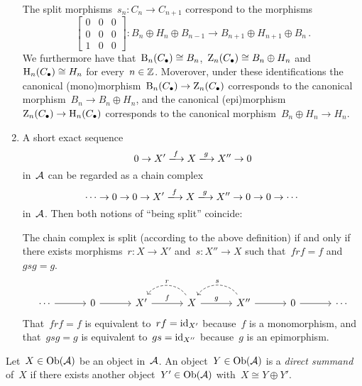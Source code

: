 \begin{remark*}
\begin{enumerate}
      The split morphisms~$s_n \colon C_n \to C_{n+1}$ correspond to the morphisms
      \[
        \begin{bmatrix}
          0 & 0 & 0 \\
          0 & 0 & 0 \\
          1 & 0 & 0
        \end{bmatrix}
        \colon
        B_n \oplus H_n \oplus B_{n-1}
        \to
        B_{n+1} \oplus H_{n+1} \oplus B_n \,.
      \]
      We furthermore have that~$\operatorname{B}_n(C_\bullet) \cong B_n$,~$\operatorname{Z}_n(C_\bullet) \cong B_n \oplus H_n$ and~$\operatorname{H}_n(C_\bullet) \cong H_n$ for every~$n \in \mathbb{Z}$.
      Moverover, under these identifications the canonical (mono)mor\-phism~$\operatorname{B}_n(C_\bullet) \to \operatorname{Z}_n(C_\bullet)$ corresponds to the canonical morphism~$B_n \to B_n \oplus H_n$, and the canonical (epi)morphism~$\operatorname{Z}_n(C_\bullet) \to \operatorname{H}_n(C_\bullet)$ corresponds to the canonical morphism~$B_n \oplus H_n \to H_n$.
    \item
      A short exact sequence
      \[
        0
        \to
        X'
        \xlongto{f}
        X
        \xlongto{g}
        X''
        \to
        0
      \]
      in~$\mathcal{A}$ can be regarded as a chain complex
      \[
        \dotsb
        \to
        0
        \to
        0
        \to
        X'
        \xlongto{f}
        X
        \xlongto{g}
        X''
        \to
        0
        \to
        0
        \to
        \dotsb
      \]
      in~$\mathcal{A}$.
      Then both notions of \enquote{being split} coincide:
      
      The chain complex is split (according to the above definition) if and only if there exists morphisms~$r \colon X \to X'$ and~$s \colon X'' \to X$ such that~$frf = f$ and~$gsg = g$.
      \[
        \begin{tikzcd}[column sep = 3.2em]
            \dotsb
            \arrow{r}
          & 0
            \arrow{r}
          & X'
            \arrow{r}[above]{f}
          & X
            \arrow[dashed, bend right=55]{l}[above]{r}
            \arrow{r}[above]{g}
          & X''
            \arrow[dashed, bend right=55]{l}[above]{s}
            \arrow{r}
          & 0
            \arrow{r}
          & \dotsb
        \end{tikzcd}
      \]
      That~$frf = f$ is equivalent to~$rf = \operatorname{id}_{X'}$ because~$f$ is a monomorphism, and that~$gsg = g$ is equivalent to~$gs = \operatorname{id}_{X''}$ because~$g$ is an epimorphism.
  \end{enumerate}
\end{remark*}


\begin{definition*}
  Let~$X \in \operatorname{Ob}(\mathcal{A})$ be an object in~$\mathcal{A}$.
  An object~$Y \in \operatorname{Ob}(\mathcal{A})$ is a \emph{direct summand} of~$X$ if there exists another object~$Y' \in \operatorname{Ob}(\mathcal{A})$ with~$X \cong Y \oplus Y'$.
\end{definition*}


